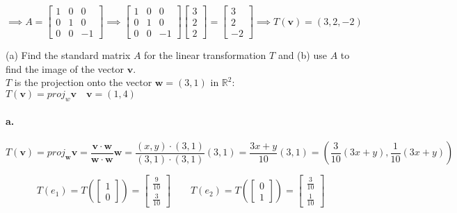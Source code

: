 \documentclass{report}
\begin{document}
$$
\implies A = \begin{bmatrix} 1 & 0 & 0 \\ 0 & 1 & 0 \\ 0 & 0 & -1 \end{bmatrix} \implies  \begin{bmatrix} 1 & 0 & 0 \\ 0 & 1 & 0 \\ 0 & 0 & -1 \end{bmatrix} \begin{bmatrix} 3 \\ 2 \\ 2 \end{bmatrix} = \begin{bmatrix} 3 \\ 2 \\ -2 \end{bmatrix} \implies T(\bm{v}) = (3,2,-2)
$$

\begin{tcolorbox}[colframe = lightred]
	(a) Find the standard matrix $A$ for the linear transformation $T$ and (b) use $A$ to find the image of the vector $\bm{v}$. \\
	
	
	
	$T$ is the projection onto the vector $\bm{w} = (3,1)$ in $\mathbb{R}^2$: $T(\bm{v}) = proj_w \bm{v} \quad \bm{v} = (1,4)$
\end{tcolorbox}

\paragraph{a.}

$$
T(\bm{v}) = proj_{\bm{w}} \bm{v} = \frac{\bm{v} \cdot \bm{w}}{\bm{w} \cdot \bm{w}} \bm{w} = \frac{(x,y) \cdot (3,1)}{(3,1) \cdot (3,1)} (3,1) = \frac{3x+y}{10} (3,1) = \left( \frac{3}{10} (3x+y), \frac{1}{10} (3x+y) \right)
$$

$$
T(e_1) = T \left( \begin{bmatrix} 1 \\ 0 \end{bmatrix} \right)  = \begin{bmatrix} \frac{9}{10} \\ \frac{3}{10} \end{bmatrix} \quad \quad T(e_2) = T \left( \begin{bmatrix} 0 \\ 1 \end{bmatrix} \right)  = \begin{bmatrix} \frac{3}{10} \\ \frac{1}{10} \end{bmatrix}
$$
\end{document}
